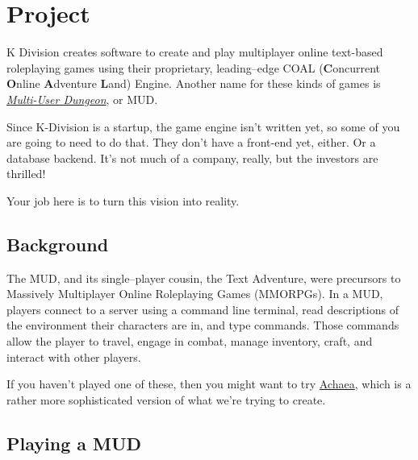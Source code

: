 \documentclass{article}
\newcommand{\enterProblemHeader}[1]{
}
\newcommand{\exitProblemHeader}[1]{
\nobreak\extramarks{#1}{}\nobreak
}
\newcounter{homeworkProblemCounter} %
\newcommand{\homeworkProblemName}{}
\newenvironment{homeworkProblem}[1][Problem \arabic{homeworkProblemCounter}]{ %
\stepcounter{homeworkProblemCounter} %
\renewcommand{\homeworkProblemName}{#1} %
\section{\homeworkProblemName} %
\enterProblemHeader{\homeworkProblemName} %
}{
\exitProblemHeader{\homeworkProblemName} %
}
\newcommand{\homeworkSectionName}{}
\newenvironment{homeworkSection}[1]{ %
\renewcommand{\homeworkSectionName}{#1} %
\subsection{\homeworkSectionName} %
\enterProblemHeader{\homeworkProblemName\ [\homeworkSectionName]} %
}{
\enterProblemHeader{\homeworkProblemName} %
}
\begin{document}
\begin{homeworkProblem}[Project]

  K Division creates software to create and play multiplayer online text-based roleplaying games using their proprietary, leading--edge COAL (\textbf{C}oncurrent \textbf{O}nline \textbf{A}dventure \textbf{L}and) Engine. Another name for these kinds of games is \textit{\href{https://en.wikipedia.org/wiki/MUD}{Multi-User Dungeon}}, or MUD.
	
	Since K-Division is a startup, the game engine isn't written yet, so some of you are going to need to do that. They don't have a front-end yet, either. Or a database backend. It's not much of a company, really, but the investors are thrilled!
	
	Your job here is to turn this vision into reality.


\begin{homeworkSection}{Background}
	The MUD, and its single--player cousin, the Text Adventure, were precursors to Massively Multiplayer Online Roleplaying Games (MMORPGs). In a MUD, players connect to a server using a command line terminal, read descriptions of the environment their characters are in, and type commands. Those commands allow the player to travel, engage in combat, manage inventory, craft, and interact with other players.
	
	If you haven't played one of these, then you might want to try \href{https://play.achaea.com/}{Achaea}, which is a rather more sophisticated version of what we're trying to create.
\end{homeworkSection}

\begin{homeworkSection}{Playing a MUD}

	\begin{figure}
		\centering
\end{figure}
\end{homeworkSection}
\end{homeworkProblem}
\end{document}
